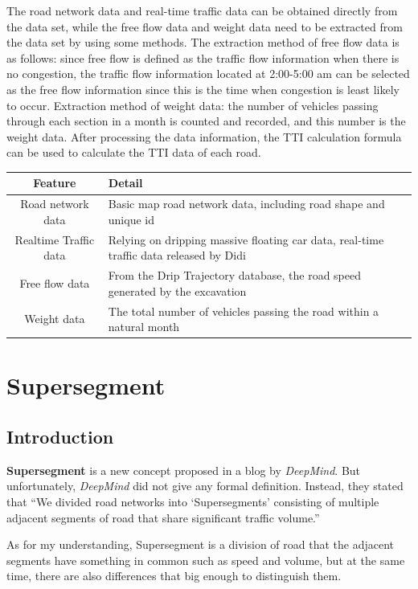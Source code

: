 \documentclass[fontset=none]{ctexart}
\theoremstyle{definition}
\theoremstyle{remark}
\begin{document}
The road network data and real-time traffic data can be obtained directly from the data set, while the free flow data and weight data need to be extracted from the data set by using some methods.
The extraction method of free flow data is as follows: since free flow is defined as the traffic flow information when there is no congestion, the traffic flow information located at 2:00-5:00 am can be selected as the free flow information since this is the time when congestion is least likely to occur.
Extraction method of weight data: the number of vehicles passing through each section in a month is counted and recorded, and this number is the weight data.
After processing the data information, the TTI calculation formula can be used to calculate the TTI data of each road.
\begin{table}[h]
  \begin{tabular}{|c|p{}|}
    \hline
    \textbf{Feature} & \textbf{Detail}\\
    \hline
    Road network data & Basic map road network data, including road shape and unique id\\
    \hline
    Realtime Traffic data & Relying on dripping massive floating car data, real-time traffic data released by Didi\\
    \hline
    Free flow data & From the Drip Trajectory database, the road speed generated by the excavation\\
    \hline
    Weight data & The total number of vehicles passing the road within a natural month\\
    \hline
  \end{tabular}
\end{table}

\clearpage
\section{Supersegment}
\subsection{Introduction}
\textbf{Supersegment} is a new concept proposed in a blog by \textit{DeepMind}.
But unfortunately, \textit{DeepMind} did not give any formal definition. Instead, they stated that
``We divided road networks into `Supersegments' consisting of multiple adjacent segments of road that share significant traffic volume.''\cite{blog}

As for my understanding, Supersegment is a division of road that the adjacent segments have something
in common such as speed and volume, but at the same time, there are also differences that big enough
to distinguish them.
\end{document}
